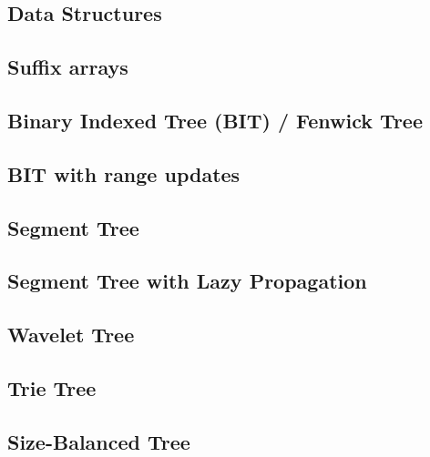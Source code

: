 \documentclass[10pt]{extarticle}
\begin{document}
\begin{multicols*}{3}
\section{Data Structures}

\subsection{Suffix arrays} %


\subsection{Binary Indexed Tree (BIT) / Fenwick Tree} %


\subsection{BIT with range updates} %


\subsection{Segment Tree} %


\subsection{Segment Tree with Lazy Propagation} %


\subsection{Wavelet Tree} %


\subsection{Trie Tree} %


\subsection{Size-Balanced Tree}



\end{multicols*}
\end{document}
